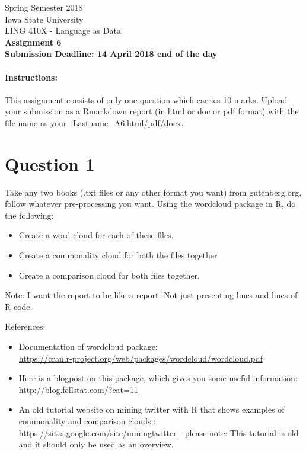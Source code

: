 \documentclass[11pt,a4paper]{article}
\begin{document}
\begin{center}
  Spring Semester 2018 \\ Iowa State University\\[3ex]
  {\large LING 410X - Language as Data}\\[3ex]
  \textbf{Assignment 6} \\ \textbf{Submission Deadline: 14 April 2018 end of the day}
\end{center}


\paragraph{Instructions:} This assignment consists of only one question which carries 10 marks. Upload your submission as a Rmarkdown report (in html or doc or pdf format) with the file name as your\_Lastname\_A6.html/pdf/docx. 

\section*{Question 1} 
Take any two books (.txt files or any other format you want) from gutenberg.org, follow whatever pre-processing you want. Using the wordcloud package in R, do the following:
\begin{itemize}
\item Create a word cloud for each of these files.
\item Create a commonality cloud for both the files together
\item Create a comparison cloud for both files together.
\end{itemize}

Note: I want the report to be like a report. Not just presenting lines and lines of R code. 


References:
\begin{itemize}
\item Documentation of wordcloud package: \\ \url{https://cran.r-project.org/web/packages/wordcloud/wordcloud.pdf}
\item Here is a  blogpost on this package, which gives you some useful information: \\ \url{http://blog.fellstat.com/?cat=11}
\item An old tutorial website on mining twitter with R that shows examples of commonality and comparison clouds : \\ \url{https://sites.google.com/site/miningtwitter} 
- please note: This tutorial is old and it should only be used as an overview.
\end{itemize}
\end{document}
